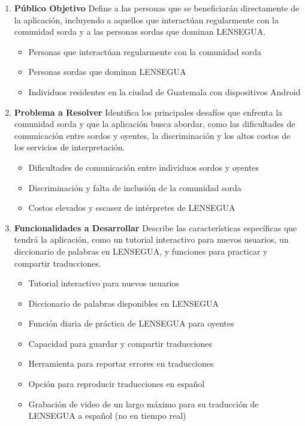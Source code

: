 \begin{enumerate}

    \item \textbf{Público Objetivo} 
    Define a las personas que se beneficiarán directamente de la aplicación, incluyendo a aquellos que interactúan regularmente con la comunidad sorda y a las personas sordas que dominan LENSEGUA.
    \begin{itemize}
        \item Personas que interactúan regularmente con la comunidad sorda
        \item Personas sordas que dominan LENSEGUA
        \item Individuos residentes en la ciudad de Guatemala con dispositivos Android
    \end{itemize}
    
    \item \textbf{Problema a Resolver} 
    Identifica los principales desafíos que enfrenta la comunidad sorda y que la aplicación busca abordar, como las dificultades de comunicación entre sordos y oyentes, la discriminación y los altos costos de los servicios de interpretación.
    \begin{itemize}
        \item Dificultades de comunicación entre individuos sordos y oyentes
        \item Discriminación y falta de inclusión de la comunidad sorda
        \item Costos elevados y escasez de intérpretes de LENSEGUA
    \end{itemize}
    
    \item \textbf{Funcionalidades a Desarrollar} 
    Describe las características específicas que tendrá la aplicación, como un tutorial interactivo para nuevos usuarios, un diccionario de palabras en LENSEGUA, y funciones para practicar y compartir traducciones.
    \begin{itemize}
        \item Tutorial interactivo para nuevos usuarios
        \item Diccionario de palabras disponibles en LENSEGUA
        \item Función diaria de práctica de LENSEGUA para oyentes
        \item Capacidad para guardar y compartir traducciones
        \item Herramienta para reportar errores en traducciones
        \item Opción para reproducir traducciones en español
        \item Grabación de video de un largo máximo para su traducción de LENSEGUA a español (no en tiempo real)
    \end{itemize}
    

\end{enumerate}
